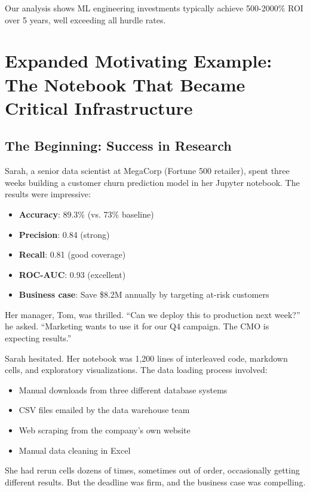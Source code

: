 Our analysis shows ML engineering investments typically achieve 500-2000\% ROI over 5 years, well exceeding all hurdle rates.

\section{Expanded Motivating Example: The Notebook That Became Critical Infrastructure}

\subsection{The Beginning: Success in Research}

Sarah, a senior data scientist at MegaCorp (Fortune 500 retailer), spent three weeks building a customer churn prediction model in her Jupyter notebook. The results were impressive:

\begin{itemize}
    \item \textbf{Accuracy}: 89.3\% (vs. 73\% baseline)
    \item \textbf{Precision}: 0.84 (strong)
    \item \textbf{Recall}: 0.81 (good coverage)
    \item \textbf{ROC-AUC}: 0.93 (excellent)
    \item \textbf{Business case}: Save \$8.2M annually by targeting at-risk customers
\end{itemize}

Her manager, Tom, was thrilled. ``Can we deploy this to production next week?'' he asked. ``Marketing wants to use it for our Q4 campaign. The CMO is expecting results.''

Sarah hesitated. Her notebook was 1,200 lines of interleaved code, markdown cells, and exploratory visualizations. The data loading process involved:
\begin{itemize}
    \item Manual downloads from three different database systems
    \item CSV files emailed by the data warehouse team
    \item Web scraping from the company's own website
    \item Manual data cleaning in Excel
\end{itemize}

She had rerun cells dozens of times, sometimes out of order, occasionally getting different results. But the deadline was firm, and the business case was compelling.

